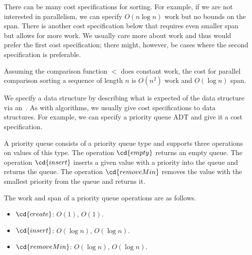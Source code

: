 \begin{gram}
There can be many cost specifications for sorting.  For example, if we
are not interested in parallelism, we can specify $O(n \log{n})$ work
but no bounds on the span. There is another cost specification below
that requires even smaller span but allows for more work.
%
We usually care more about work and thus would prefer the first cost
specification; there might, however, be cases where the second
specification is preferable.
\end{gram}

\begin{costspec}
Assuming the comparison function $<$ does constant work, the cost for
parallel comparison sorting a sequence of length $n$ is $O(n^2)$ work
and $O(\log n)$ span.
\end{costspec}
%


\begin{gram}
We specify a data structure by describing what is expected of the data
structure via an~.
%
As with algorithms, we usually give cost specifications to data
structures.
%
For example, we can specify a priority queue ADT and give it a cost
specification. 
%
\end{gram}

\begin{datatype}
A priority queue consists of a priority queue type and supports three
operations on values of this type.  The operation $\cd{empty}$ returns
an empty queue.  The operation $\cd{insert}$ inserts a given value with
a priority into the queue and returns the queue.  The operation
$\cd{removeMin}$ removes the value with the smallest priority from the
queue and returns it.
\end{datatype}

%
\begin{costspec}
The work and span of a priority queue operations are as follows.
\begin{itemize}
\item $\cd{create}$: $O(1)$, $O(1)$.
\item $\cd{insert}$: $O(\log{n})$, $O(\log{n})$.
\item $\cd{removeMin}$: $O(\log{n})$, $O(\log{n})$.
\end{itemize}
\end{costspec}


